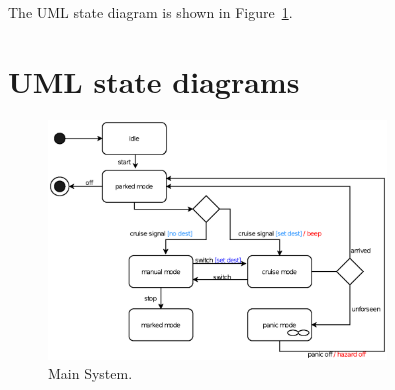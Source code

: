 \documentclass[12pt]{article}
\begin{document}
\begin{spacing}{1.5}
\noindent The UML state diagram is shown in Figure~\ref{fig:main-system-fig}.

\newpage

\section{UML state diagrams}

\begin{figure}[h!]
	\centering
		\includegraphics[width=0.8\textwidth]{./A2_Figures/4.1-Main-System.eps}
		  \caption{Main System.}
  \label{fig:main-system-fig}
\end{figure}

\end{spacing}
\end{document}
